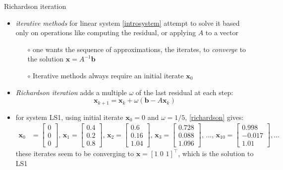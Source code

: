 \documentclass[10pt,hyperref]{beamer}
\newcommand{\bb}{\mathbf{b}}
\newcommand{\bx}{\mathbf{x}}
\begin{document}
\begin{frame}{Richardson iteration}

\begin{itemize}
\item \emph{iterative methods} for linear system \eqref{introsystem} attempt to solve it based only on operations like computing the residual, or applying $A$ to a vector
  \begin{itemize}
  \item[$\circ$] one wants the sequence of approximations, the iterates, to \emph{converge} to the solution $\bx = A^{-1} \bb$
  \item[$\circ$] Iterative methods always require an initial iterate $\bx_0$
  \end{itemize}
\item \emph{Richardson iteration} adds a multiple $\omega$ of the last residual at each step:
\begin{equation}
\bx_{k+1} = \bx_k + \omega (\bb - A \bx_k)  \label{richardson}
\end{equation}
\item for system LS1, using initial iterate $\bx_0=0$ and $\omega=1/5$, \eqref{richardson} gives:\small
\begin{align*}
\bx_0 &= \begin{bmatrix} 0 \\ 0 \\ 0 \end{bmatrix}, \,
\bx_1 = \begin{bmatrix} 0.4 \\ 0.2 \\ 0.8 \end{bmatrix}, \,
\bx_2 = \begin{bmatrix} 0.6 \\ 0.16 \\ 1.04 \end{bmatrix}, \,
\bx_3 = \begin{bmatrix} 0.728 \\ 0.088 \\ 1.096 \end{bmatrix}, \, \dots, \,
\bx_{10} = \begin{bmatrix} 0.998 \\ -0.017 \\ 1.01 \end{bmatrix},
\dots
\end{align*}
these iterates seem to be converging to $\bx = [1 \,\, 0 \,\, 1]^\top$, which is the solution to LS1
\end{itemize}
\end{frame}
\end{document}
